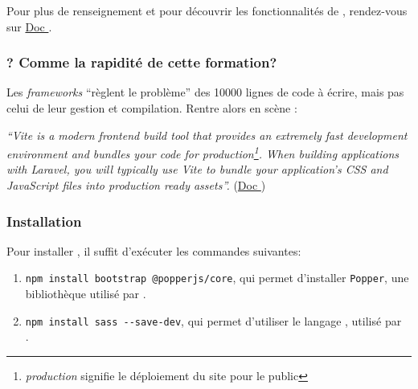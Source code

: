 \documentclass[internal]{nhitec_design}
\begin{document}
Pour plus de renseignement et pour découvrir les fonctionnalités de \bs{}, rendez-vous sur \href{https://getbootstrap.com/docs/5.3/getting-started/introduction/}{Doc \bs{}}.

\subsubsection[Vite? Comme la rapidité de cette formation?][laravel.com/docs/10.x/vite\#introduction]{\vite{}? Comme la rapidité de cette formation?}
Les \textit{frameworks} ``règlent le problème'' des 10000 lignes de code à écrire, mais pas celui de leur gestion et compilation. Rentre alors en scène \vite:

\textit{``Vite is a modern frontend build tool that provides an extremely fast development environment and bundles your code for production\footnote{\textit{production} signifie le déploiement du site pour le public}. When building applications with Laravel, you will typically use Vite to bundle your application's CSS and JavaScript files into production ready assets''.} (\href{https://laravel.com/docs/10.x/vite#introduction}{Doc \laravel{}})
\subsubsection{Installation}

Pour installer \bs{}, il suffit d'exécuter les commandes suivantes:
\begin{enumerate}
    \item \verb|npm install bootstrap @popperjs/core|, qui permet d'installer \verb|Popper|, une bibliothèque \js{} utilisé par \bs{}.
    \item \verb|npm install sass --save-dev|, qui permet d'utiliser le langage \sass{}, utilisé par \\ \bs{}.
\end{enumerate}
\end{document}
